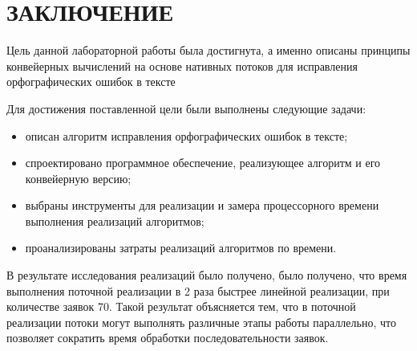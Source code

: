 \chapter*{ЗАКЛЮЧЕНИЕ}

Цель данной лабораторной работы была достигнута, а именно описаны принципы конвейерных вычислений на основе нативных потоков для исправления орфографических ошибок в тексте

Для достижения поставленной цели были выполнены следующие задачи:
\begin{itemize}
	\item описан алгоритм исправления орфографических ошибок в тексте;
	\item спроектировано программное обеспечение, реализующее алгоритм и его конвейерную версию;
	\item выбраны инструменты для реализации и замера процессорного времени
	выполнения реализаций алгоритмов;
	\item проанализированы затраты реализаций алгоритмов по времени.
\end{itemize}


В результате исследования реализаций было получено, было получено, что время выполнения поточной реализации в 2 раза быстрее линейной реализации, при количестве заявок 70. Такой результат объясняется тем, что в поточной реализации потоки могут выполнять различные этапы работы параллельно, что позволяет сократить время обработки последовательности заявок.
